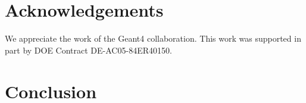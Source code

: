 \section{Acknowledgements}

We appreciate the work of the Geant4 collaboration.
This work was supported in part by DOE Contract DE-AC05-84ER40150.


\section{Conclusion}



